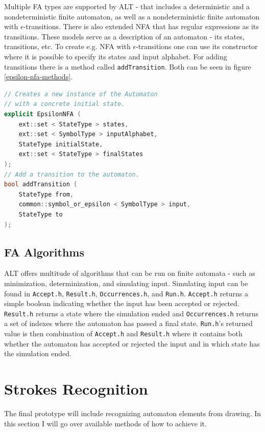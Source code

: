 Multiple FA types are supported by ALT - that includes a deterministic and a nondeterministic finite automaton, as well as a nondeterministic finite automaton with $\epsilon$-transitions. There is also extended NFA that has regular expressions as its transitions. These models serve as a description of an automaton - its states, transitions, etc. To create e.g. NFA with $\epsilon$-transitions one can use its constructor where it is possible to specify its states and input alphabet. For adding transitions there is a method called \lstinline{addTransition}. Both can be seen in figure \ref{epsilon-nfa-methods}.

\begin{lstlisting}[language=C++, caption=EpsilonNFA example methods, label=epsilon-nfa-methods]
// Creates a new instance of the Automaton
// with a concrete initial state.
explicit EpsilonNFA ( 
    ext::set < StateType > states,
    ext::set < SymbolType > inputAlphabet, 
    StateType initialState, 
    ext::set < StateType > finalStates
);
// Add a transition to the automaton.
bool addTransition ( 
    StateType from,
    common::symbol_or_epsilon < SymbolType > input,
    StateType to 
);
\end{lstlisting}

\subsection{FA Algorithms}

ALT offers multitude of algorithms that can be run on finite automata - such as minimization, determinization, and simulating input. Simulating input can be found in \lstinline{Accept.h}, \lstinline{Result.h}, \lstinline{Occurrences.h}, and \lstinline{Run.h}. \lstinline{Accept.h} returns a simple boolean indicating whether the input has been accepted or rejected. \lstinline{Result.h} returns a state where the simulation ended and \lstinline{Occurrences.h} returns a set of indexes where the automaton has passed a final state. \lstinline{Run.h}'s returned value is then combination of \lstinline{Accept.h} and \lstinline{Result.h} where it contains both whether the automaton has accepted or rejected the input and in which state has the simulation ended.

\section{Strokes Recognition}

The final prototype will include recognizing automaton elements from drawing. In this section I will go over available methods of how to achieve it.

